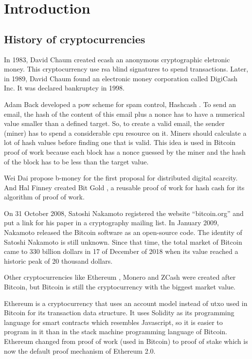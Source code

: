 \section{Introduction}

\subsection{History of cryptocurrencies} 

In 1983, David Chaum created ecash \cite{panurach1996money} an anonymous cryptographic eletronic money.
This cryptocurrency use \gls{rsa} blind signatures \cite{chaum1983blind} to spend transactions.
Later, in 1989, David Chaum found an electronic money corporation called DigiCash Inc.
It was declared bankruptcy in 1998.

Adam Back developed a \gls{pow} scheme for spam control, Hashcash \cite{back2002hashcash}.
To send an email, the hash of the content of this email plus a nonce has to have a numerical value
smaller than a defined target.
So, to create a valid email, the sender (miner) has to spend a considerable \gls{cpu} resource on it.
Miners should calculate a lot of hash values before finding one that is valid.
This idea is used in Bitcoin proof of work because each block has a nonce guessed by the miner and
the hash of the block has to be less than the target value.

Wei Dai propose b-money \cite{dai1998b} for the first proposal for distributed digital scarcity.
And Hal Finney created Bit Gold \cite{wallace2011rise}, a reusable proof of work for hash cash for
its algorithm of proof of work.

On 31 October 2008, Satoshi Nakamoto registered the website ``bitcoin.org'' and put a link for his
paper \cite{nakamoto2008bitcoin} in a cryptography mailing list.
In January 2009, Nakamoto released the Bitcoin software as an open-source code.
The identity of Satoshi Nakamoto is still unknown.
Since that time, the total market of Bitcoin came to 330 billion dollars in 17 of December of 2018
when its value reached a historic peak of 20 thousand dollars.

Other cryptocurrencies like Ethereum \cite{wood2014ethereum}, Monero \cite{noether2015ring} and
ZCash \cite{hopwood2016zcash} were created after Bitcoin,
but Bitcoin is still the cryptocurrency with the biggest market value.

Ethereum is a cryptocurrency that uses an account model instead of \gls{utxo} used in Bitcoin for its
transaction data structure.
It uses Solidity as its programming language for smart contracts which resembles Javascript,
so it is easier to program in it than in the stack machine programming language of Bitcoin.
Ethereum changed from proof of work (used in Bitcoin) to proof of stake
which is now the default proof mechanism of Ethereum 2.0.

